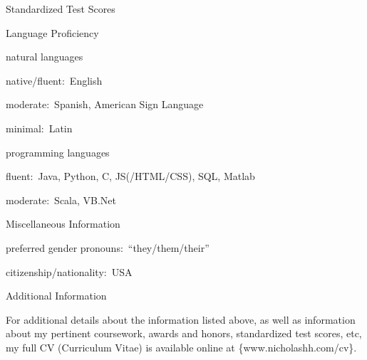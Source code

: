 \documentclass{resume}
\begin{document}
{\begin{rSection}{Standardized Test Scores}
  \end{rSection}





  \begin{rSection}{Language Proficiency}

  \begin{rSubSection}{\normalfont natural languages}{}{}{}
  \item native/fluent:~English
  \item moderate:~Spanish, American Sign Language
  \item minimal:~Latin
  \end{rSubSection}

  \begin{rSubSection}{\normalfont programming languages}{}{}{}
  \item fluent:~Java, Python, C, JS(/HTML/CSS), SQL, Matlab
  \item moderate:~Scala, VB.Net
  \end{rSubSection}

  \end{rSection}





  \begin{rSection}{Miscellaneous Information}

  preferred gender pronouns:~``they/them/their''

  citizenship/nationality:~USA

  \end{rSection}





}{
  
  \begin{rSection}{Additional Information}

    For additional details about the information listed above, as well as information \\
    about my pertinent coursework, awards and honors, standardized test scores, etc, \\
    my full CV (Curriculum Vitae) is available online at \{www.nicholashh.com/cv\}.

  \end{rSection}

}
\end{document}
